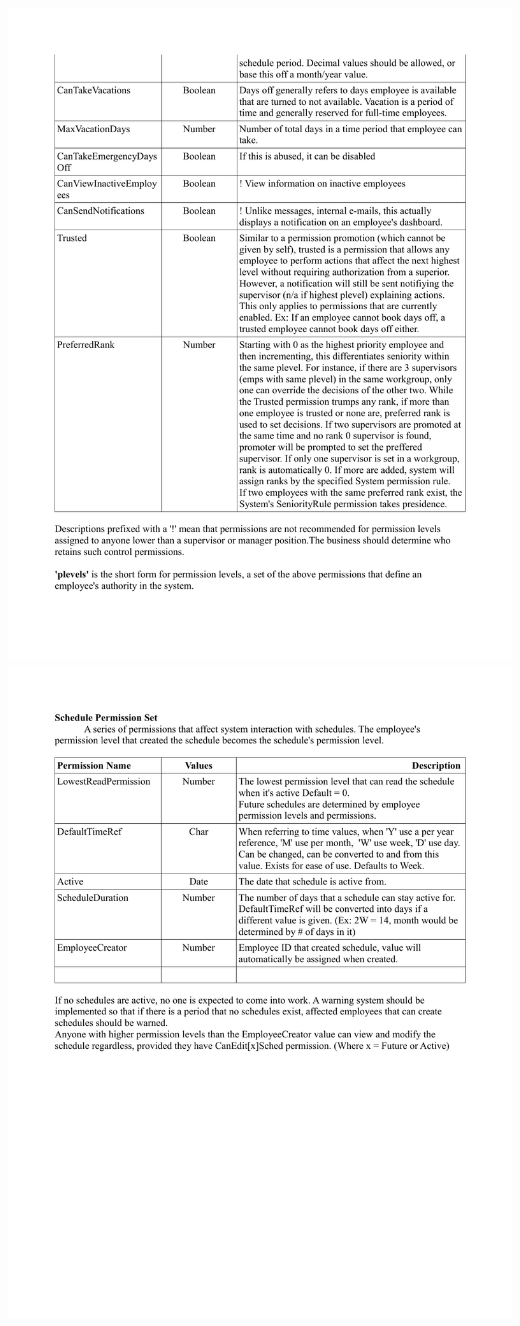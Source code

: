 \documentclass[letterpaper,12pt]{report}
\begin{document}
\newpage
\includegraphics[scale=0.8, trim=20mm 0mm 0mm 0mm]{externals/PermissionTable2.pdf}
\newpage
\includegraphics[scale=0.8, trim=20mm 0mm 0mm 0mm]{externals/PermissionTable3.pdf}
\end{document}
